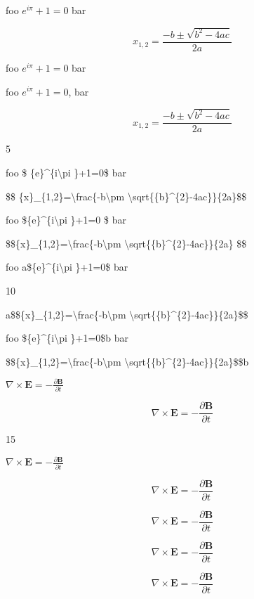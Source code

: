 
\def\mytitle{Math}


foo \({e}^{i\pi }+1=0\) bar

\[ {x}_{1,2}=\frac{-b\pm \sqrt{{b}^{2}-4ac}}{2a} \]

foo ${e}^{i\pi }+1=0$ bar

foo ${e}^{i\pi }+1=0$, bar

$${x}_{1,2}=\frac{-b\pm \sqrt{{b}^{2}-4ac}}{2a}$$

5

foo \$ \{e\}\^{}\{i\textbackslash{}pi \}+1=0\$ bar

\$\$ \{x\}\_\{1,2\}=\textbackslash{}frac\{-b\textbackslash{}pm \textbackslash{}sqrt\{\{b\}\^{}\{2\}-4ac\}\}\{2a\}\$\$

foo \$\{e\}\^{}\{i\textbackslash{}pi \}+1=0 \$ bar

\$\$\{x\}\_\{1,2\}=\textbackslash{}frac\{-b\textbackslash{}pm \textbackslash{}sqrt\{\{b\}\^{}\{2\}-4ac\}\}\{2a\} \$\$

foo a\$\{e\}\^{}\{i\textbackslash{}pi \}+1=0\$ bar

10

a\$\$\{x\}\_\{1,2\}=\textbackslash{}frac\{-b\textbackslash{}pm \textbackslash{}sqrt\{\{b\}\^{}\{2\}-4ac\}\}\{2a\}\$\$

foo \$\{e\}\^{}\{i\textbackslash{}pi \}+1=0\$b bar

\$\$\{x\}\_\{1,2\}=\textbackslash{}frac\{-b\textbackslash{}pm \textbackslash{}sqrt\{\{b\}\^{}\{2\}-4ac\}\}\{2a\}\$\$b

$\nabla \times \mathbf{E} = - \frac{\partial \mathbf{B}}{\partial t}$

$$\nabla \times \mathbf{E} = - \frac{\partial \mathbf{B}}{\partial t}$$

15

\(\nabla \times \mathbf{E} = - \frac{\partial \mathbf{B}}{\partial t}\)

\[\nabla \times \mathbf{E} = - \frac{\partial \mathbf{B}}{\partial t}\]

\begin{equation}\nabla \times \mathbf{E} = - \frac{\partial \mathbf{B}}{\partial t}\end{equation}

\begin{equation}\nabla \times \mathbf{E} = - \frac{\partial \mathbf{B}}{\partial t}\end{equation}

\begin{equation}\nabla \times \mathbf{E} = - \frac{\partial \mathbf{B}}{\partial t}\end{equation}


